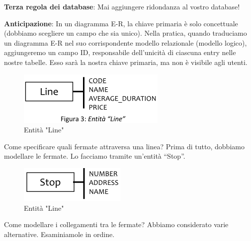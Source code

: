 \textbf{Terza regola dei database}: Mai aggiungere ridondanza al vostro database! 

\textbf{Anticipazione}: In un diagramma E-R, la chiave primaria è solo concettuale (dobbiamo scegliere un campo che sia unico). Nella pratica, quando traduciamo un diagramma E-R nel suo corrispondente modello relazionale (modello logico), aggiungeremo un campo ID, responsabile dell’unicità di ciascuna entry nelle nostre tabelle. Esso sarà la nostra chiave primaria, ma non è visibile agli utenti. 

\begin{center}
\begin{figure}[H]
\centering
\includegraphics[scale=1]{figures/line_entity.png}
\caption{Entità "Line"} 
\end{figure}
\end{center}

Come specificare quali fermate attraversa una linea? Prima di tutto, dobbiamo modellare le fermate. Lo facciamo tramite un’entità “Stop”. 

\begin{center}
\begin{figure}[H]
\centering
\includegraphics[scale=1]{figures/stop_entity.png}
\caption{Entità "Line"} 
\end{figure}
\end{center}

Come modellare i collegamenti tra le fermate? Abbiamo considerato varie alternative. Esaminiamole in ordine. 

